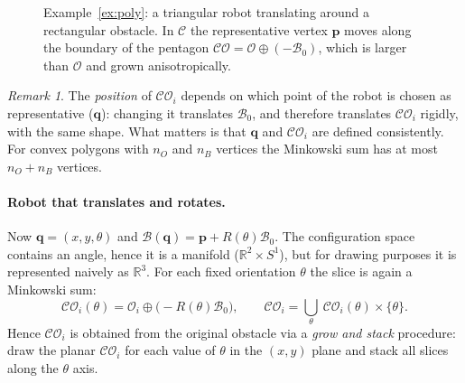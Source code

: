 \documentclass[11pt,a4paper]{article}
\newcommand{\Cspace}{\mathcal{C}}
\newcommand{\Wspace}{\mathcal{W}}
\newcommand{\CO}{\mathcal{CO}}
\newcommand{\Obs}{\mathcal{O}}
\newcommand{\Rob}{\mathcal{B}}
\newcommand{\R}{\mathbb{R}}
\newcommand{\vq}{\boldsymbol{q}}
\newcommand{\Mink}{\oplus}
\theoremstyle{definition}
\theoremstyle{plain}
\theoremstyle{remark}
\newtheorem{remark}[definition]{Remark}
\begin{document}
\begin{figure}[H]
\centering
{}
\caption{Example~\ref{ex:poly}: a triangular robot translating around a rectangular obstacle. In $\Cspace$ the representative vertex $\boldsymbol p$ moves along the boundary of the pentagon $\CO=\Obs\Mink(-\Rob_0)$, which is larger than $\Obs$ and grown anisotropically.}
\label{fig:poly}
\end{figure}

\begin{remark}
The \emph{position} of $\CO_i$ depends on which point of the robot is chosen as representative ($\vq$): changing it translates $\Rob_0$, and therefore translates $\CO_i$ rigidly, with the same shape. What matters is that $\vq$ and $\CO_i$ are defined consistently. For convex polygons with $n_O$ and $n_B$ vertices the Minkowski sum has at most $n_O+n_B$ vertices.
\end{remark}

\paragraph{Robot that translates and rotates.}
Now $\vq=(x,y,\theta)$ and $\Rob(\vq)=\boldsymbol p+R(\theta)\Rob_0$. The configuration space contains an angle, hence it is a manifold ($\R^2\times S^1$), but for drawing purposes it is represented naively as $\R^3$. For each fixed orientation $\theta$ the slice is again a Minkowski sum:
\[
  \CO_i(\theta)=\Obs_i\Mink\bigl(-R(\theta)\Rob_0\bigr),\qquad
  \CO_i=\bigcup_{\theta}\ \CO_i(\theta)\times\{\theta\}.
\]
Hence $\CO_i$ is obtained from the original obstacle via a \emph{grow and stack} procedure: draw the planar $\CO_i$ for each value of $\theta$ in the $(x,y)$ plane and stack all slices along the $\theta$ axis.
\end{document}
